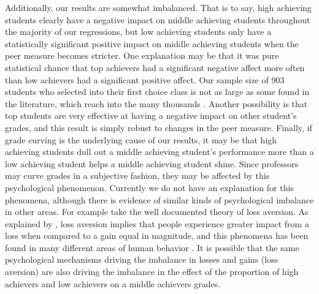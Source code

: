 Additionally, our results are somewhat imbalanced. That is to say, high achieving students clearly have a negative impact on middle achieving students throughout the majority of our regressions, but low achieving students only have a statistically significant positive impact on middle achieving students when the peer measure becomes stricter. 
One explanation may be that it was pure statistical chance that top achievers had a significant negative affect more often than low achievers had a significant positive affect. 
Our sample size of 903 students who selected into their first choice class is not as large as some found in the literature, which reach into the many thousands \citep{kang2007classroom,lavy2012good}. 
Another possibility is that top students are very effective at having a negative impact on other student's grades, and this result is simply robust to changes in the peer measure. 
Finally, if grade curving is the underlying cause of our results, it may be that high achieving students dull out a middle achieving student's performance more than a low achieving student helps a middle achieving student shine.
Since professors may curve grades in a subjective fashion, they may be affected by this psychological phenomenon. 
Currently we do not have an explanation for this phenomena, although there is evidence of similar kinds of psychological imbalance in other areas. 
For example take the well documented theory of loss aversion. 
As explained by \citet{tversky1991loss}, loss aversion implies that people experience greater impact from a loss when compared to a gain equal in magnitude, and this phenomena has been found in many different areas of human behavior \citep{shalev2002loss,goette2004loss}. 
It is possible that the same psychological mechanisms driving the imbalance in losses and gains (loss aversion) are also driving the imbalance in the effect of the proportion of high achievers and low achievers on a middle achievers grades. 

